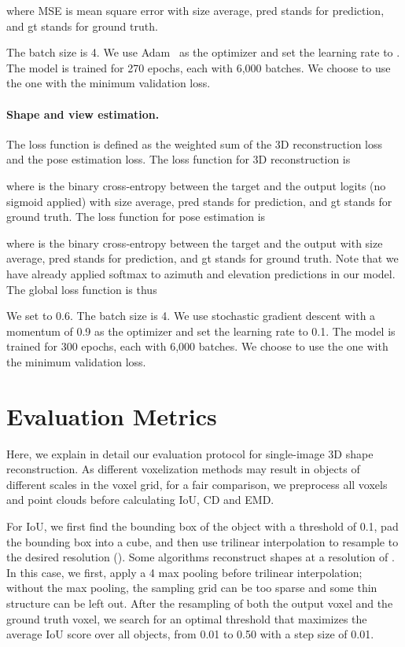 \documentclass[10pt,twocolumn,letterpaper]{article}
\newcommand{\myparagraph}[1]{\vspace{-14pt}\paragraph{#1}}
\begin{document}
where MSE is mean square error with size average, pred stands for prediction, and gt stands for ground truth.

The batch size is 4. We use Adam~\cite{Kingma2015Adam:} as the optimizer and set the learning rate to . The model is trained for 270 epochs, each with 6,000 batches. We choose to use the one with the minimum validation loss.

\myparagraph{Shape and view estimation. }
The loss function is defined as the weighted sum of the 3D reconstruction loss and the pose estimation loss. The loss function for 3D reconstruction is 

where  is the binary cross-entropy between the target and the output logits (no sigmoid applied) with size average, pred stands for prediction, and gt stands for ground truth.
The loss function for pose estimation is 

where  is the binary cross-entropy between the target and the output with size average, pred stands for prediction, and gt stands for ground truth. Note that we have already applied softmax to azimuth and elevation predictions in our model. The global loss function is thus


We set  to 0.6. The batch size is 4. We use stochastic gradient descent with a momentum of 0.9 as the optimizer and set the learning rate to 0.1. The model is trained for 300 epochs, each with 6,000 batches. We choose to use the one with the minimum validation loss. \section{Evaluation Metrics}
\label{sec:eval}

Here, we explain in detail our evaluation protocol for single-image 3D shape reconstruction. As different voxelization methods may result in objects of different scales in the voxel grid, for a fair comparison, we preprocess all voxels and point clouds before calculating IoU, CD and EMD. 

For IoU, we first find the bounding box of the object with a threshold of 0.1, pad the bounding box into a cube, and then use trilinear interpolation to resample to the desired resolution (). Some algorithms reconstruct shapes at a resolution of . In this case, we first, apply a 4 max pooling before trilinear interpolation; without the max pooling, the sampling grid can be too sparse and some thin structure can be left out. After the resampling of both the output voxel and the ground truth voxel, we search for an optimal threshold that maximizes the average IoU score over all objects, from 0.01 to 0.50 with a step size of 0.01. 
\end{document}
